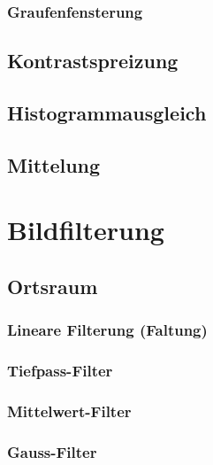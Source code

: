 \documentclass[a4paper, 11pt, accentcolor = tud3b]{tudreport}
\begin{document}
				\subsubsection{Graufenfensterung} %

			\subsection{Kontrastspreizung} %

			\subsection{Histogrammausgleich} %

			\subsection{Mittelung} %

		\section{Bildfilterung} %

			\subsection{Ortsraum} %

				\subsubsection{Lineare Filterung (Faltung)} %

				\subsubsection{Tiefpass-Filter} %

				\subsubsection{Mittelwert-Filter} %

				\subsubsection{Gauss-Filter} %
\end{document}

